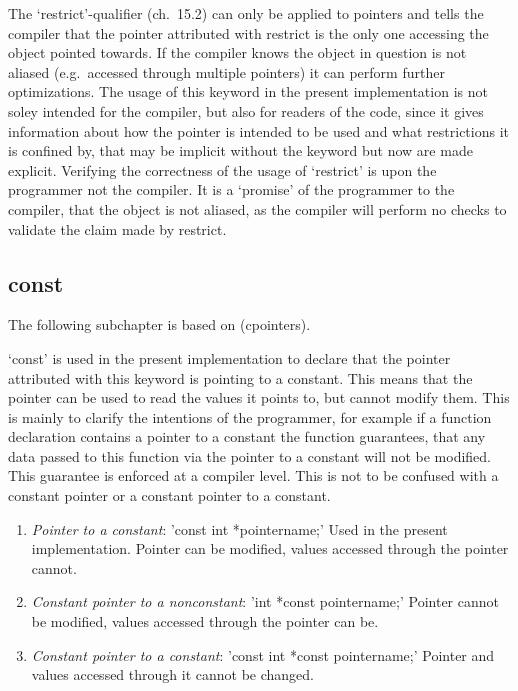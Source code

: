 The `restrict'-qualifier (ch.~15.2) can only be applied to pointers and
tells the compiler that the pointer attributed with restrict is the only
one accessing the object pointed towards. If the compiler knows the
object in question is not aliased (e.g.~accessed through multiple
pointers) it can perform further optimizations. The usage of this
keyword in the present implementation is not soley intended for the
compiler, but also for readers of the code, since it gives information
about how the pointer is intended to be used and what restrictions it is
confined by, that may be implicit without the keyword but now are made
explicit. Verifying the correctness of the usage of `restrict' is upon
the programmer not the compiler. It is a `promise' of the programmer to
the compiler, that the object is not aliased, as the compiler will
perform no checks to validate the claim made by restrict.

\hypertarget{const}{%
\subsection{const}\label{const}}

The following subchapter is based on (cpointers).

`const' is used in the present implementation to declare that the
pointer attributed with this keyword is pointing to a constant. This
means that the pointer can be used to read the values it points to, but
cannot modify them. This is mainly to clarify the intentions of the
programmer, for example if a function declaration contains a pointer to
a constant the function guarantees, that any data passed to this
function via the pointer to a constant will not be modified. This
guarantee is enforced at a compiler level. This is not to be confused
with a constant pointer or a constant pointer to a constant.

\begin{enumerate}
\def\labelenumi{\arabic{enumi}.}

\item
  \emph{Pointer to a constant}: 'const int *pointername;' Used in the
  present implementation. Pointer can be modified, values accessed
  through the pointer cannot.
\item
  \emph{Constant pointer to a nonconstant}: 'int *const pointername;'
  Pointer cannot be modified, values accessed through the pointer can
  be.
\item
  \emph{Constant pointer to a constant}: 'const int *const pointername;'
  Pointer and values accessed through it cannot be changed.
\end{enumerate}

